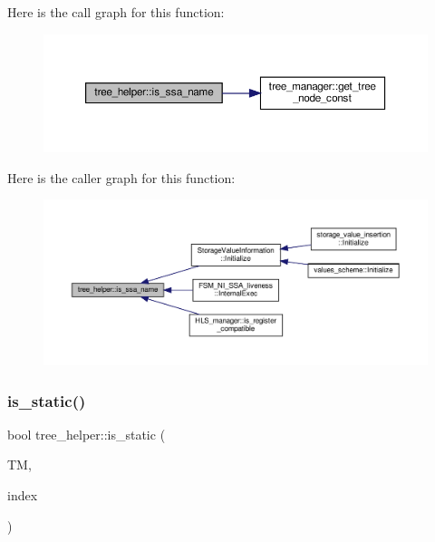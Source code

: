 Here is the call graph for this function\+:
\nopagebreak
\begin{figure}[H]
\begin{center}
\leavevmode
\includegraphics[width=350pt]{d7/d99/classtree__helper_ad4b926e495f820818638a879ba292f4b_cgraph}
\end{center}
\end{figure}
Here is the caller graph for this function\+:
\nopagebreak
\begin{figure}[H]
\begin{center}
\leavevmode
\includegraphics[width=350pt]{d7/d99/classtree__helper_ad4b926e495f820818638a879ba292f4b_icgraph}
\end{center}
\end{figure}
\mbox{\label{classtree__helper_a962b5e392c5e3b7c9f461c4460ee6f8b}} 
\subsubsection{\texorpdfstring{is\+\_\+static()}{is\_static()}}
{\footnotesize\ttfamily bool tree\+\_\+helper\+::is\+\_\+static (\begin{DoxyParamCaption}\item[{const \hyperlink{tree__manager_8hpp_a792e3f1f892d7d997a8d8a4a12e39346}{tree\+\_\+manager\+Const\+Ref} \&}]{TM,  }\item[{const unsigned int}]{index }\end{DoxyParamCaption})\hspace{0.3cm}{\ttfamily [static]}}



